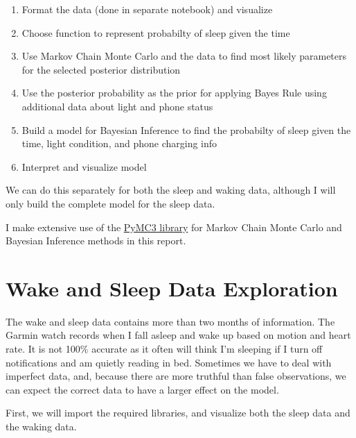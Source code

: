 \documentclass[12pt]{article}
\providecommand{\tightlist}{%
      \setlength{\itemsep}{0pt}\setlength{\parskip}{0pt}}
\begin{document}
\begin{enumerate}
\def\labelenumi{\arabic{enumi}.}
\tightlist
\item
  Format the data (done in separate notebook) and visualize
\item
  Choose function to represent probabilty of sleep given the time
\item
  Use Markov Chain Monte Carlo and the data to find most likely
  parameters for the selected posterior distribution
\item
  Use the posterior probability as the prior for applying Bayes Rule
  using additional data about light and phone status
\item
  Build a model for Bayesian Inference to find the probabilty of sleep
  given the time, light condition, and phone charging info
\item
  Interpret and visualize model
\end{enumerate}

We can do this separately for both the sleep and waking data, although I
will only build the complete model for the sleep data.

I make extensive use of the
\href{https://github.com/pymc-devs/pymc3}{PyMC3 library} for Markov
Chain Monte Carlo and Bayesian Inference methods in this report.

    \hypertarget{wake-and-sleep-data-exploration}{%
\section{Wake and Sleep Data
Exploration}\label{wake-and-sleep-data-exploration}}

The wake and sleep data contains more than two months of information.
The Garmin watch records when I fall asleep and wake up based on motion
and heart rate. It is not 100\% accurate as it often will think I'm
sleeping if I turn off notifications and am quietly reading in bed.
Sometimes we have to deal with imperfect data, and, because there are
more truthful than false observations, we can expect the correct data to
have a larger effect on the model.

First, we will import the required libraries, and visualize both the
sleep data and the waking data.
\end{document}
